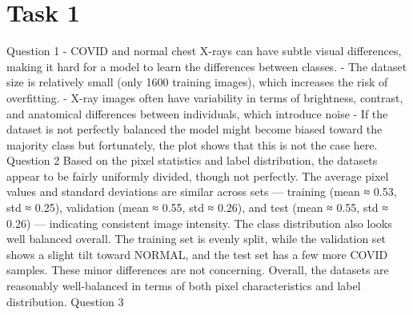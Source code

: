 \section{Task 1}
Question 1
-	COVID and normal chest X-rays can have subtle visual differences, making it hard for a model to learn the differences between classes.
-	The dataset size is relatively small (only 1600 training images), which increases the risk of overfitting.
-	X-ray images often have variability in terms of brightness, contrast, and anatomical differences between individuals, which introduce noise
-	If the dataset is not perfectly balanced the model might become biased toward the majority class but fortunately, the plot shows that this is not the case here.
Question 2
Based on the pixel statistics and label distribution, the datasets appear to be fairly uniformly divided, though not perfectly. The average pixel values and standard deviations are similar across sets — training (mean ≈ 0.53, std ≈ 0.25), validation (mean ≈ 0.55, std ≈ 0.26), and test (mean ≈ 0.55, std ≈ 0.26) — indicating consistent image intensity. The class distribution also looks well balanced overall. The training set is evenly split, while the validation set shows a slight tilt toward NORMAL, and the test set has a few more COVID samples. These minor differences are not concerning. Overall, the datasets are reasonably well-balanced in terms of both pixel characteristics and label distribution.
Question 3
